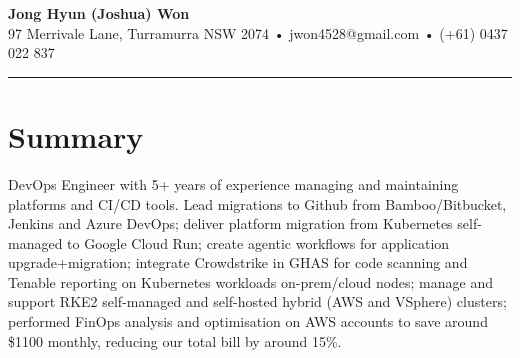 \documentclass[11pt,letterpaper]{article}
\begin{document}

\newcommand{\SubItem}[1]{
	{\setlength\itemindent{15pt} \item[-] #1}
}

\begin{center}
{\fontsize{24}{28}\selectfont\bfseries\color{headercolor} Jong Hyun (Joshua) Won}\\[0.5em]
97 Merrivale Lane, Turramurra NSW 2074 • jwon4528@gmail.com • (+61) 0437 022 837
\end{center}
\noindent\rule{\textwidth}{2pt}
\section*{Summary}
DevOps Engineer with 5+ years of experience managing and maintaining platforms and CI/CD tools. Lead migrations to Github from Bamboo/Bitbucket, Jenkins and Azure DevOps; deliver platform migration from Kubernetes self-managed to Google Cloud Run; create agentic workflows for application upgrade+migration; integrate Crowdstrike in GHAS for code scanning and Tenable reporting on Kubernetes workloads on-prem/cloud nodes; manage and support RKE2 self-managed and self-hosted hybrid (AWS and VSphere) clusters; performed FinOps analysis and optimisation on AWS accounts to save around \$1100 monthly, reducing our total bill by around 15\%.
\end{document}
